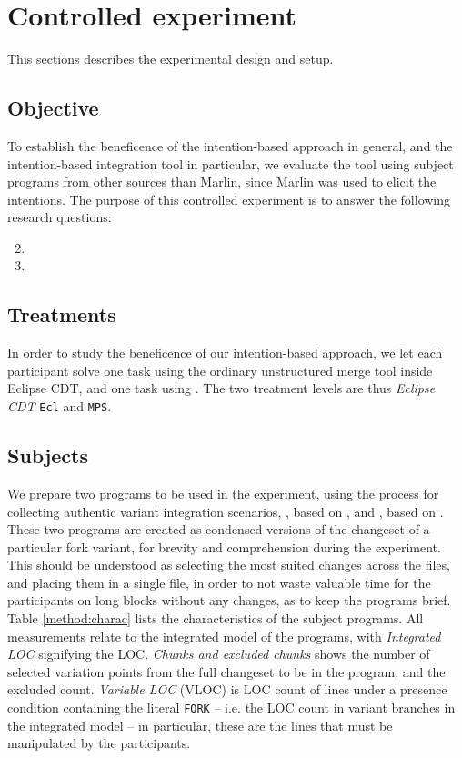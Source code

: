 \section{Controlled experiment}
This sections describes the experimental design and setup.

\subsection{Objective}
To establish the beneficence of the intention-based approach in general, and the intention-based integration tool in particular, we evaluate the tool using subject programs from other sources than Marlin, since Marlin was used to elicit the intentions. The purpose of this controlled experiment is to answer the following research questions:
\begin{enumerate}[label={Q\arabic*}]
    \setcounter{enumi}{1}
    \item \RQB
    \item \RQC
\end{enumerate}

\subsection{Treatments}
In order to study the beneficence of our intention-based approach, we let each participant solve one task using the ordinary unstructured merge tool inside Eclipse CDT, and one task using \tooln. The two treatment levels are thus \textit{Eclipse CDT} \texttt{Ecl} and \textit{\tooln} \texttt{MPS}.

\subsection{Subjects}
We prepare two programs to be used in the experiment, using the process for collecting authentic variant integration scenarios, \po, based on \busybox, and \pt, based on \vim. These two programs are created as condensed versions of the changeset of a particular fork variant, for brevity and comprehension during the experiment. This should be understood as selecting the most suited changes across the files, and placing them in a single file, in order to not waste valuable time for the participants on long blocks without any changes, as to keep the programs brief. Table \ref{method:charac} lists the characteristics of the subject programs. All measurements relate to the integrated model of the programs, with \textit{Integrated LOC} signifying the LOC. \textit{Chunks and excluded chunks} shows the number of selected variation points from the full changeset to be in the program, and the excluded count. \textit{Variable LOC} (VLOC) is LOC count of lines under a presence condition containing the literal \texttt{FORK} -- i.e. the LOC count in variant branches in the integrated model -- in particular, these are the lines that must be manipulated by the participants.


